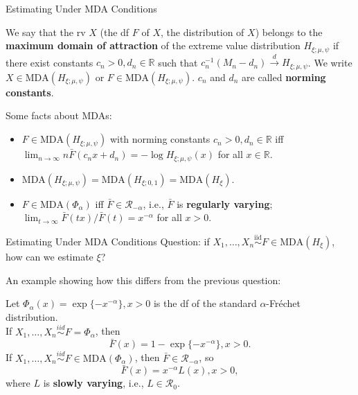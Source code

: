 \documentclass{beamer}
\newcommand{\MDA}{\text{MDA}}
\begin{document}
\begin{frame}{Estimating Under MDA Conditions}
    \begin{definition}
        We say that the rv $X$ (the df $F$ of $X$, the distribution of $X$) belongs to the \textbf{maximum domain of attraction} of the extreme value distribution $H_{\xi; \mu, \psi}$ if there exist constants $c_n > 0, d_n \in \mathbb{R}$ such that $c_n^{-1}(M_n - d_n) \xrightarrow{d} H_{\xi; \mu, \psi}$. We write $X \in \MDA(H_{\xi; \mu, \psi})$ or $F \in \MDA(H_{\xi; \mu, \psi})$. $c_n$ and $d_n$ are called \textbf{norming constants}.
    \end{definition}
    Some facts about MDAs:
    \begin{itemize}
        \item $F \in \MDA(H_{\xi; \mu, \psi})$ with norming constants $c_n > 0, d_n \in \mathbb{R}$ iff $\lim_{n \to \infty} n\bar{F}(c_n x + d_n) = -\log H_{\xi; \mu, \psi}(x)$ for all $x \in \mathbb{R}$.
        \item $\MDA(H_{\xi; \mu, \psi}) = \MDA(H_{\xi; 0, 1}) = \MDA(H_{\xi})$.
        \item $F \in \MDA(\Phi_{\alpha})$ iff $\bar{F} \in \mathcal{R}_{-\alpha}$, i.e., $\bar{F}$ is \textbf{regularly varying}; $\lim_{t \to \infty} \bar{F}(t x) / \bar{F}(t) = x^{-\alpha}$ for all $x > 0$.
    \end{itemize}
\end{frame}

\begin{frame}{Estimating Under MDA Conditions}
    Question: if $X_1, \ldots, X_n \overset{\text{iid}}{\sim} F \in \MDA(H_{\xi})$, how can we estimate $\xi$?

    \medskip

    An example showing how this differs from the previous question:

    \medskip
    
    Let $\Phi_{\alpha}(x) = \exp\{-x^{-\alpha}\}, x > 0$ is the df of the standard $\alpha$-Fr\'{e}chet distribution. \\
    If $X_1, \ldots, X_n \overset{iid}{\sim} F = \Phi_{\alpha}$, then
    \[
    \bar{F}(x) = 1 - \exp\{-x^{-\alpha}\}, x > 0.
    \]
    If $X_1, \ldots, X_n \overset{iid}{\sim} F \in \MDA(\Phi_{\alpha})$, then $\bar{F} \in \mathcal{R}_{-\alpha}$, so
    \[
    \bar{F}(x) = x^{-\alpha}L(x), x > 0,
    \]
    where $L$ is \textbf{slowly varying}, i.e., $L \in \mathcal{R}_0$.
\end{frame}
\end{document}
